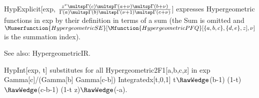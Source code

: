 \dispSFinmath{
\infty
}






HypExplicit[exp, \(\frac{{z^{\nu }}\multsp \Gamma (c)\multsp \Gamma (a+\nu )\multsp \Gamma (b+\nu )}
   {\Gamma (a)\multsp \Gamma (b)\multsp \Gamma (\nu +1)\multsp \Gamma (c+\nu )}\)] expresses Hypergeometric functions in exp by their definition
in terms of a sum (the Sum is omitted and \(\Muserfunction{HypergeometricSE}[\Mfunction{HypergeometricPFQ}[\{a,b,c\},\{d,e\},z],\nu ]\) is the summation
index).

See also:  HypergeometricIR.



\dispSFoutmath{
\nu
}

\dispSFinmath{
\nu
}








HypInt[exp, t] { }substitutes for all { }Hypergeometric2F1[a,b,c,z] in exp Gamma[c]/(Gamma[b] Gamma[c-b]) Integratedx[t,0,1] {
  }t\(\RawWedge\)(b-1) (1-t)\(\RawWedge\)(c-b-1) (1-t z)\(\RawWedge\)(-a).


